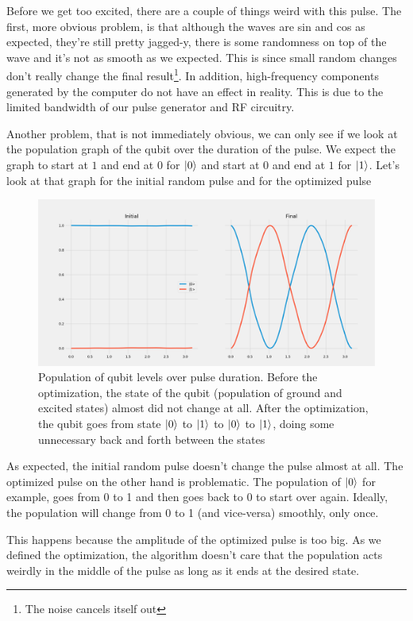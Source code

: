Before we get too excited, there are a couple of things weird with this pulse. The first, more obvious problem, is that although the waves are sin and cos as expected, they're still pretty jagged-y, there is some randomness on top of the wave and it's not as smooth as we expected. This is since small random changes don't really change the final result\footnote{The noise cancels itself out}. In addition, high-frequency components generated  by the computer do not have an effect in reality. This is due to the limited bandwidth of our pulse generator and RF circuitry.

Another problem, that is not immediately obvious, we can only see if we look at the population graph of the qubit over the duration of the pulse. We expect the graph to start at $1$ and end at $0$ for $\ket{0}$ and start at $0$ and end at $1$ for $\ket{1}$. Let's look at that graph for the initial random pulse and for the optimized pulse
\begin{figure}[H]
    \centering
    \includegraphics[width=1\columnwidth]{Results/No-Constraints-single-qubit/level-population-pretty2.png}
    \caption{Population of qubit levels over pulse duration. Before the optimization, the state of the qubit (population of ground and excited states) almost did not change at all. After the optimization, the qubit goes from state $\ket{0}$ to $\ket{1}$ to $\ket{0}$ to $\ket{1}$, doing some unnecessary back and forth between the states}
    \label{fig:GRAPE-first-example-level-population}
\end{figure}
As expected, the initial random pulse doesn't change the pulse almost at all. The optimized pulse on the other hand is problematic. The population of $\ket{0}$ for example, goes from 0 to 1 and then goes back to 0 to start over again. Ideally, the population will change from 0 to 1 (and vice-versa) smoothly, only once.

This happens because the amplitude of the optimized pulse is too big. As we defined the optimization, the algorithm doesn't care that the population acts weirdly in the middle of the pulse as long as it ends at the desired state.

